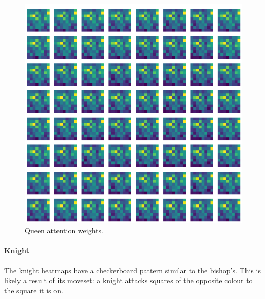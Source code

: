 \begin{figure}[H]
\begin{minipage}{0.475\textwidth}
    \includegraphics[width=\textwidth]{project/img/attention_maps/Q_weights_6.png}
    \caption{Queen attention weights.}
    \label{atnQ1}
  \end{minipage}
\end{figure}

\newpage

\paragraph{Knight} The knight heatmaps have a checkerboard pattern similar to
the bishop's. This is likely a result of its moveset: a knight attacks
squares of the opposite colour to the square it is on.

